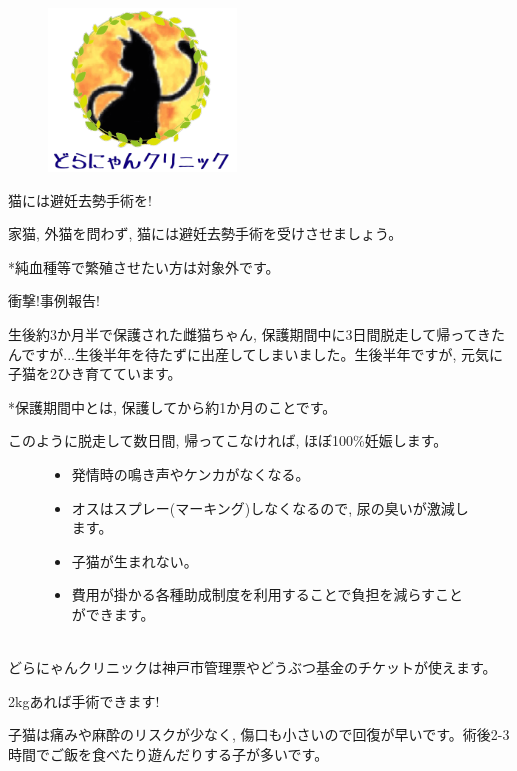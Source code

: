 \documentclass{jsarticle}
\begin{document}
\begin{figure}[htbp]
	\begin{center}
		\includegraphics[width=5cm]{Tra2.png}
	\end{center}
\end{figure}

\Huge
\vspace{-10pt}
  猫には避妊去勢手術を!

\Large
  家猫, 外猫を問わず, 猫には避妊去勢手術を受けさせましょう。

  *純血種等で繁殖させたい方は対象外です。

  衝撃!事例報告!

  生後約3か月半で保護された雌猫ちゃん, 保護期間中に3日間脱走して帰ってきたんですが...生後半年を待たずに出産してしまいました。生後半年ですが, 元気に子猫を2ひき育てています。

  *保護期間中とは, 保護してから約1か月のことです。

	このように脱走して数日間, 帰ってこなければ, ほぼ100\%妊娠します。

	\begin{figure}[htbp]
		\Large
		\centering
		\begin{minipage}{0.4\columnwidth}
			\begin{itemize}
				\item 発情時の鳴き声やケンカがなくなる。
				\item オスはスプレー(マーキング)しなくなるので, 尿の臭いが激減します。
				\item 子猫が生まれない。
			\end{itemize}
		\end{minipage}
		\begin{minipage}{0.4\columnwidth}
			\begin{itemize}
				\item 費用が掛かる各種助成制度を利用することで負担を減らすことができます。\\\\
			\end{itemize}
		\end{minipage}
	\end{figure}

  どらにゃんクリニックは神戸市管理票やどうぶつ基金のチケットが使えます。







\newpage
\huge
  2\si{\kilogram}あれば手術できます!

\Large
  子猫は痛みや麻酔のリスクが少なく, 傷口も小さいので回復が早いです。術後2-3時間でご飯を食べたり遊んだりする子が多いです。
\end{document}
